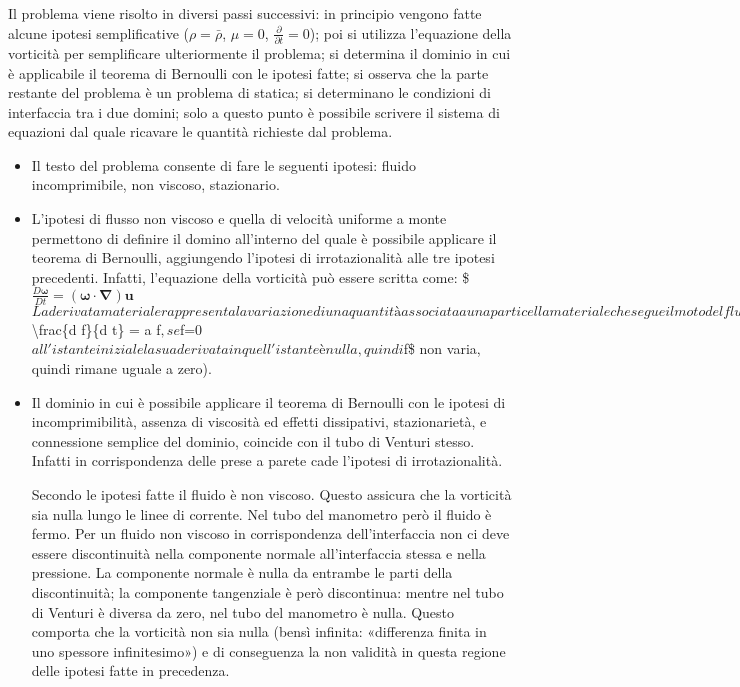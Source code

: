\documentclass[letterpaper,10pt,italian]{jupyterBook}
\begin{document}
\sphinxAtStartPar
Il problema viene risolto in diversi passi successivi: in principio
vengono fatte alcune ipotesi semplificative (\(\rho = \bar{\rho}\),
\(\mu=0\), \(\frac{\partial}{\partial t}=0\)); poi si utilizza l’equazione
della vorticità per semplificare ulteriormente il problema; si determina
il dominio in cui è applicabile il teorema di Bernoulli con le ipotesi
fatte; si osserva che la parte restante del problema è un problema di
statica; si determinano le condizioni di interfaccia tra i due domini;
solo a questo punto è possibile scrivere il sistema di equazioni dal
quale ricavare le quantità richieste dal problema.
\begin{itemize}
\item {} 
\sphinxAtStartPar
Il testo del problema consente di fare le seguenti ipotesi: fluido
incomprimibile, non viscoso, stazionario.

\item {} 
\sphinxAtStartPar
L’ipotesi di flusso non viscoso e quella di velocità uniforme a
monte permettono di definire il domino all’interno del quale è
possibile applicare il teorema di Bernoulli, aggiungendo l’ipotesi
di irrotazionalità alle tre ipotesi precedenti. Infatti, l’equazione
della vorticità può essere scritta come:
\$\(\frac{D \bm{\omega}}{Dt} = (\bm{\omega} \cdot \bm{\nabla}) \bm{u}\)\(
La derivata materiale rappresenta la variazione di una quantità
associata a una particella materiale che segue il moto del fluido.
Poiché la vorticità nella sezione a monte è nulla (il profilo di
velocità è uniforme quindi le derivate spaziali sono nulle), la
vorticità rimane nulla (\)\textbackslash{}frac\{d f\}\{d t\} = a f\(, se \)f=0\(
all'istante iniziale la sua derivata in quell'istante è nulla,
quindi \)f\$ non varia, quindi rimane uguale a zero).

\item {} 
\sphinxAtStartPar
Il dominio in cui è possibile applicare il teorema di Bernoulli con
le ipotesi di incomprimibilità, assenza di viscosità ed effetti
dissipativi, stazionarietà,  e connessione
semplice del dominio, coincide con il tubo di Venturi stesso.
Infatti in corrispondenza delle prese a parete cade l’ipotesi di
irrotazionalità.

\sphinxAtStartPar
Secondo le ipotesi fatte il fluido è non viscoso. Questo assicura
che la vorticità sia nulla lungo le linee di corrente. Nel tubo del
manometro però il fluido è fermo. Per un fluido non viscoso in
corrispondenza dell’interfaccia non ci deve essere discontinuità
nella componente normale all’interfaccia stessa e nella pressione.
La componente normale è nulla da entrambe le parti della
discontinuità; la componente tangenziale è però discontinua: mentre
nel tubo di Venturi è diversa da zero, nel tubo del manometro è
nulla. Questo comporta che la vorticità non sia nulla (bensì
infinita: «differenza finita in uno spessore infinitesimo») e di
conseguenza la non validità in questa regione delle ipotesi fatte in
precedenza.


\end{itemize}
\end{document}
